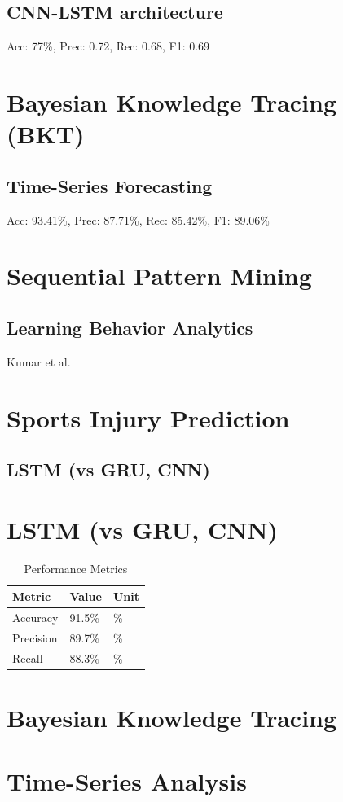 \documentclass[twocolumn]{svjour3}
\begin{document}
\subsection{CNN-LSTM architecture}
Acc: 77\%, Prec: 0.72, Rec: 0.68, F1: 0.69
\section{Bayesian Knowledge Tracing (BKT)}
\subsection{Time-Series Forecasting}
Acc: 93.41\%, Prec: 87.71\%, Rec: 85.42\%, F1: 89.06\%
\section{Sequential Pattern Mining}
\subsection{Learning Behavior Analytics}
Kumar et al. \cite{16}
\section{Sports Injury Prediction}
\subsection{LSTM (vs GRU, CNN)}

\section{LSTM (vs GRU, CNN)}
\begin{table}
\centering
\caption{Performance Metrics}
\begin{tabular}{lll}
\hline
Metric & Value & Unit \\
\hline
Accuracy & 91.5\% & \% \\
Precision & 89.7\% & \% \\
Recall & 88.3\% & \% \\
\hline
\end{tabular}
\end{table}
\section{Bayesian Knowledge Tracing}
\section{Time-Series Analysis}
\end{document}
